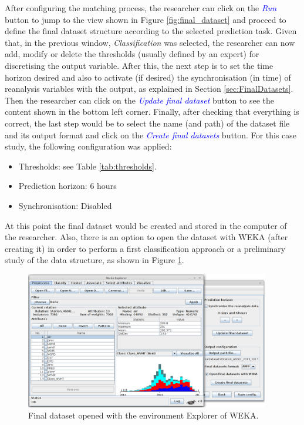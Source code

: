 \documentclass[energies,article,submit,moreauthors,pdftex]{Definitions/mdpi}
\begin{document}
		After configuring the matching process, the researcher can click on the \textcolor{blue}{\textit{Run}} button to jump to the view shown in Figure \ref{fig:final_dataset} and proceed to define the final dataset structure according to the selected prediction task. Given that, in the previous window, \textit{Classification} was selected, the researcher can now add, modify or delete the thresholds (usually defined by an expert) for discretising the output variable. After this, the next step is to set the time horizon desired and also to activate (if desired) the synchronisation (in time) of reanalysis variables with the output, as explained in Section {\ref{sec:FinalDatasets}}. Then the researcher can click on the \textcolor{blue}{\textit{Update final dataset}} button to see the content shown in the bottom left corner. Finally, after checking that everything is correct, the last step would be to select the name (and path) of the dataset file and its output format and click on the \textcolor{blue}{\textit{Create final datasets}} button. For this case study, the following configuration was applied:		
		\begin{itemize}[leftmargin=*,labelsep=5.8mm]
			\item Thresholds: see Table \ref{tab:thresholds}.
			\item Prediction horizon: 6 hours
			\item Synchronisation: Disabled
		\end{itemize}
		
		At this point the final dataset would be created and stored in the computer of the researcher. Also, there is an option to open the dataset with WEKA (after creating it) in order to perform a first classification approach or a preliminary study of the data structure, as shown in Figure \ref{fig:openigFinalDatasetWeka}.
		
		\begin{figure}[H]
			\centering
			\includegraphics[width=0.95\textwidth]{figures/FigureOpeningFinalDatasetWeka.png}
			\caption{Final dataset opened with the environment Explorer of WEKA.}
			\label{fig:openigFinalDatasetWeka}
		\end{figure}
		
\end{document}
